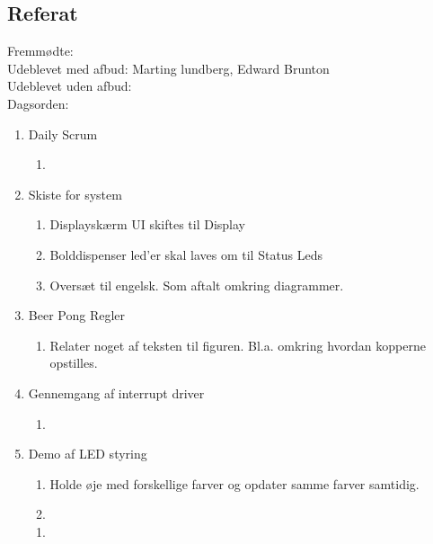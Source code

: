 \subsection{Referat}
 Fremmødte:
 \\Udeblevet med afbud: Marting lundberg, Edward Brunton
 \\Udeblevet uden afbud: 
 \\Dagsorden: 
\begin{enumerate}
    \item Daily Scrum
    \begin{enumerate}
        \item 
    \end{enumerate}
    \item Skiste for system
    \begin{enumerate}
        \item Displayskærm UI skiftes til Display
        \item Bolddispenser led'er skal laves om til Status Leds
        \item Oversæt til engelsk. Som aftalt omkring diagrammer.
    \end{enumerate}
    \item Beer Pong Regler
    \begin{enumerate}
        \item Relater noget af teksten til figuren. Bl.a. omkring hvordan kopperne opstilles.
    \end{enumerate}
    \item Gennemgang af interrupt driver
    \begin{enumerate}
        \item 
    \end{enumerate}
    \item Demo af LED styring
    \begin{enumerate}
        \item Holde øje med forskellige farver og opdater samme farver samtidig.
        \item 
    \end{enumerate}
    \begin{enumerate}
        \item 
    \end{enumerate}
\end{enumerate}
